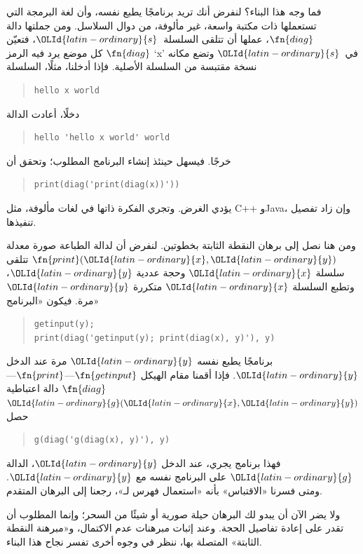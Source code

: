 \documentclass[../../../include/open-logic-section]{subfiles}
\begin{document}
\begin{explain}
فما وجه هذا البناء؟ لنفرض أنك تريد برنامجًا يطبع نفسه،
وأن لغة البرمجة التي تستعملها ذات مكتبة واسعة، غير مألوفة، من دوال
السلاسل. ومن جملتها دالة $\fn{diag}$، عملها
أن تتلقى السلسلة~$\OLId{latin-ordinary}{s}$، فتعيّن $\fn{diag}$ كل موضع يرد فيه
الرمز `x' في~$\OLId{latin-ordinary}{s}$ وتضع مكانه نسخة مقتبسة من السلسلة الأصلية. فإذا
أدخلنا، مثلًا، السلسلة
\begin{quote}
\begin{verbatim}
hello x world
\end{verbatim}
\end{quote}
دخلًا، أعادت الدالة
\begin{quote}
\begin{verbatim}
hello 'hello x world' world
\end{verbatim}
\end{quote}
خرجًا. فيسهل حينئذ إنشاء البرنامج المطلوب؛ وتحقق أن
\begin{quote}
\begin{verbatim}
print(diag('print(diag(x))'))
\end{verbatim}
\end{quote}
يؤدي الغرض. وتجري الفكرة ذاتها في لغات مألوفة، مثل C++ وJava،
وإن زاد تفصيل تنفيذها.

ومن هنا نصل إلى برهان النقطة الثابتة بخطوتين. لنفرض أن
لدالة الطباعة صورة معدلة $\fn{print}(\OLId{latin-ordinary}{x},\OLId{latin-ordinary}{y})$ تتلقى سلسلة $\OLId{latin-ordinary}{x}$ وحجة
عددية $\OLId{latin-ordinary}{y}$، وتطبع السلسلة $\OLId{latin-ordinary}{x}$ متكررة $\OLId{latin-ordinary}{y}$ مرة.
فيكون «البرنامج»
\begin{quote}
\begin{verbatim}
getinput(y);
print(diag('getinput(y); print(diag(x), y)'), y)
\end{verbatim}
\end{quote}
برنامجًا يطبع نفسه $\OLId{latin-ordinary}{y}$ مرة عند الدخل $\OLId{latin-ordinary}{y}$. فإذا أقمنا مقام الهيكل
$\fn{getinput}$---$\fn{print}$---$\fn{diag}$ دالة اعتباطية
$\OLId{latin-ordinary}{g}(\OLId{latin-ordinary}{x},\OLId{latin-ordinary}{y})$ حصل
\begin{quote}
\begin{verbatim}
g(diag('g(diag(x), y)'), y)
\end{verbatim}
\end{quote}
فهذا برنامج يجري، عند الدخل $\OLId{latin-ordinary}{y}$، الدالة $\OLId{latin-ordinary}{g}$ على البرنامج نفسه مع
$\OLId{latin-ordinary}{y}$. ومتى فسرنا «الاقتباس» بأنه «استعمال فهرس لـ»، رجعنا إلى
البرهان المتقدم.

ولا يضر الآن أن يبدو لك البرهان حيلة صورية أو شيئًا من
السحر؛ وإنما المطلوب أن تقدر على إعادة تفاصيل الحجة. وعند
إثبات مبرهنات عدم الاكتمال، و«مبرهنة النقطة الثابتة» المتصلة بها،
ننظر في وجوه أخرى تفسر نجاح هذا البناء.
\end{explain}
\end{document}
